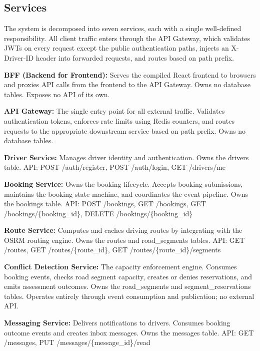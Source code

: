 \documentclass{article}
\begin{document}
\subsection{Services}
The system is decomposed into seven services, each with a single well-defined responsibility. All client traffic enters through the API Gateway, which validates JWTs on every request except the public authentication paths, injects an X-Driver-ID header into forwarded requests, and routes based on path prefix.

\vspace{0.2cm}
\noindent\textbf{BFF (Backend for Frontend):} Serves the compiled React frontend to browsers and proxies API calls from the frontend to the API Gateway. Owns no database tables. Exposes no API of its own.

\vspace{0.2cm}
\noindent\textbf{API Gateway:} The single entry point for all external traffic. Validates authentication tokens, enforces rate limits using Redis counters, and routes requests to the appropriate downstream service based on path prefix. Owns no database tables.

\vspace{0.2cm}
\noindent\textbf{Driver Service:} Manages driver identity and authentication. Owns the drivers table. API: POST /auth/register, POST /auth/login, GET /drivers/me

\vspace{0.2cm}
\noindent\textbf{Booking Service:} Owns the booking lifecycle. Accepts booking submissions, maintains the booking state machine, and coordinates the event pipeline. Owns the bookings table. API: POST /bookings, GET /bookings, GET /bookings/\{booking\_id\}, DELETE /bookings/\{booking\_id\}

\vspace{0.2cm}
\noindent\textbf{Route Service:} Computes and caches driving routes by integrating with the OSRM routing engine. Owns the routes and road\_segments tables. API: GET /routes, GET /routes/\{route\_id\}, GET /routes/\{route\_id\}/segments

\vspace{0.2cm}
\noindent\textbf{Conflict Detection Service:} The capacity enforcement engine. Consumes booking events, checks road segment capacity, creates or denies reservations, and emits assessment outcomes. Owns the road\_segments and segment\_reservations tables. Operates entirely through event consumption and publication; no external API.

\vspace{0.2cm}
\noindent\textbf{Messaging Service:} Delivers notifications to drivers. Consumes booking outcome events and creates inbox messages. Owns the messages table. API: GET /messages, PUT /messages/\{message\_id\}/read
\end{document}
